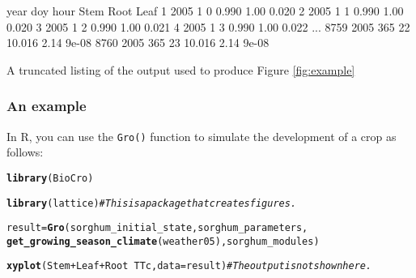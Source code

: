 \documentclass{article}\usepackage[]{graphicx}\usepackage[]{color}
\makeatletter
\newcommand{\hlcom}[1]{\textcolor[rgb]{0.678,0.584,0.686}{\textit{#1}}}%
\newcommand{\hlopt}[1]{\textcolor[rgb]{0,0,0}{#1}}%
\newcommand{\hlstd}[1]{\textcolor[rgb]{0.345,0.345,0.345}{#1}}%
\newcommand{\hlkwb}[1]{\textcolor[rgb]{0.69,0.353,0.396}{#1}}%
\newcommand{\hlkwc}[1]{\textcolor[rgb]{0.333,0.667,0.333}{#1}}%
\newcommand{\hlkwd}[1]{\textcolor[rgb]{0.737,0.353,0.396}{\textbf{#1}}}%
\newenvironment{kframe}{%
 \def\at@end@of@kframe{}%
 \ifinner\ifhmode%
  \def\at@end@of@kframe{\end{minipage}}%
  \begin{minipage}{\columnwidth}%
 \fi\fi%
 \def\FrameCommand##1{\hskip\@totalleftmargin \hskip-\fboxsep
 \colorbox{shadecolor}{##1}\hskip-\fboxsep
     \hskip-\linewidth \hskip-\@totalleftmargin \hskip\columnwidth}%
 \MakeFramed {\advance\hsize-\width
   \@totalleftmargin\z@ \linewidth\hsize
   \@setminipage}}%
 {\par\unskip\endMakeFramed%
 \at@end@of@kframe}
\newenvironment{knitrout}{}{} %
\newcommand{\code}[1]{\lstinline[style=C++style]{#1}}
\makeatother
\begin{document}
\begin{table}[!htbp]
\begin{center}
\begin{Rlisting}
     year doy hour    Stem   Root    Leaf
   1 2005   1    0   0.990   1.00   0.020
   2 2005   1    1   0.990   1.00   0.020
   3 2005   1    2   0.990   1.00   0.021
   4 2005   1    3   0.990   1.00   0.022
...
8759 2005 365   22  10.016   2.14   9e-08
8760 2005 365   23  10.016   2.14   9e-08
\end{Rlisting}
\caption{\label{tab:example_output} A truncated listing of the output used to produce Figure \ref{fig:example}}
\end{center}
\end{table}

\subsubsection{An example}
In R, you can use the \code{Gro()} function to simulate the
development of a crop as follows:

\begin{knitrout}
\color{fgcolor}\begin{kframe}
\begin{alltt}
\hlkwd{library}\hlstd{(BioCro)}
\end{alltt}


{\ttfamily\noindent\bfseries\color{errorcolor}{\#\# Error in library(BioCro): there is no package called 'BioCro'}}\begin{alltt}
\hlkwd{library}\hlstd{(lattice)}  \hlcom{# This is a package that creates figures.}

\hlstd{result} \hlkwb{=} \hlkwd{Gro}\hlstd{(sorghum_initial_state, sorghum_parameters,}
             \hlkwd{get_growing_season_climate}\hlstd{(weather05), sorghum_modules)}
\end{alltt}


{\ttfamily\noindent\bfseries{}}\begin{alltt}
\hlkwd{xyplot}\hlstd{(Stem} \hlopt{+} \hlstd{Leaf} \hlopt{+} \hlstd{Root} \hlopt{~} \hlstd{TTc,} \hlkwc{data}\hlstd{=result)}  \hlcom{# The output is not shown here.}
\end{alltt}


{\ttfamily\noindent\bfseries\color{errorcolor}{\#\# Error in eval(substitute(groups), data, environment(x)): object 'result' not found}}\end{kframe}
\end{knitrout}
\end{document}

